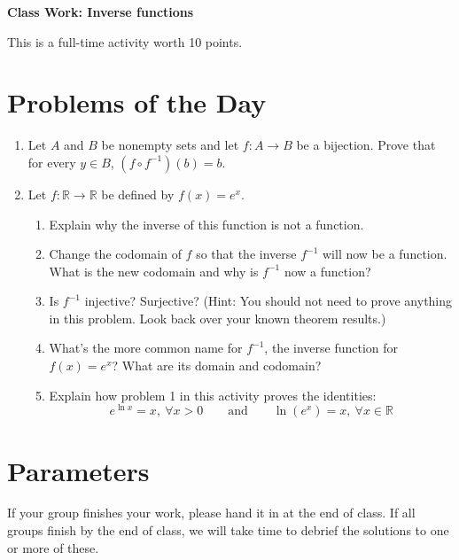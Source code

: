 \documentclass[11pt]{article}
\begin{document}
	
	\thispagestyle{empty}
	\renewcommand{\headrulewidth}{0.0pt}
	\thispagestyle{fancy}
	\lfoot{}
	\cfoot{}
	\rfoot{}	
	
	\vspace*{0in}

		\begin{center}
			\begin{large}
			\textbf{Class Work: Inverse functions} \\
			\end{large}
			This is a full-time activity worth 10 points. 
			
		\end{center}
		

\section*{Problems of the Day}

\begin{enumerate}
	
	\item Let $A$ and $B$ be nonempty sets and let $f: A \to B$ be a bijection. Prove that for every $y \in B$, $(f \circ f^{-1})(b) = b$. 
	
	\item Let $f: \mathbb{R} \to \mathbb{R}$ be defined by $f(x) = e^x$. 
	\begin{enumerate}
		\item Explain why the inverse of this function is not a function. 
		\item Change the codomain of $f$ so that the inverse $f^{-1}$ will now be a function. What is the new codomain and why is $f^{-1}$ now a function? 
		\item Is $f^{-1}$ injective? Surjective? (Hint: You should not need to prove anything in this problem. Look back over your known theorem results.) 
		\item What's the more common name for $f^{-1}$, the inverse function for $f(x) = e^x$? What are its domain and codomain? 
		\item Explain how problem 1 in this activity proves the identities: 
		\[ e^{\ln x} = x,  \ \forall x > 0 \qquad \text{and} \qquad \ln(e^x) = x,  \ \forall x \in \mathbb{R} \]
	\end{enumerate} 

	
\end{enumerate}

\section*{Parameters}

If your group finishes your work, please hand it in at the end of class. If all groups finish by the end of class, we will take time to debrief the solutions to one or more of these. 
\end{document}
